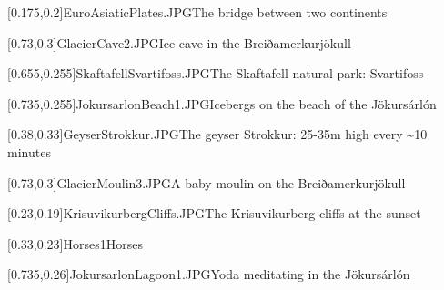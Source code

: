 



\graphicspath{{Figures/}{Figures/Iceland/}}


\subtitle{Day 2}
\date{08.10.2019}


    
    [0.175,0.2]{EuroAsiaticPlates.JPG}{The bridge between two continents}
    
    [0.73,0.3]{GlacierCave2.JPG}{Ice cave in the Breiðamerkurj\"okull}
    
    [0.655,0.255]{SkaftafellSvartifoss.JPG}{The Skaftafell natural park: Svartifoss}
    
    [0.735,0.255]{JokursarlonBeach1.JPG}{Icebergs on the beach of the J\"okurs\'arl\'on}
    
    [0.38,0.33]{GeyserStrokkur.JPG}{The geyser Strokkur: 25-35m high every \textasciitilde10 minutes}
    
    [0.73,0.3]{GlacierMoulin3.JPG}{A baby moulin on the Breiðamerkurj\"okull}
    
    [0.23,0.19]{KrisuvikurbergCliffs.JPG}{The Krisuvikurberg cliffs at the sunset}
    
    [0.33,0.23]{Horses1}{Horses}
    
    [0.735,0.26]{JokursarlonLagoon1.JPG}{Yoda meditating in the J\"okurs\'arl\'on}
    

